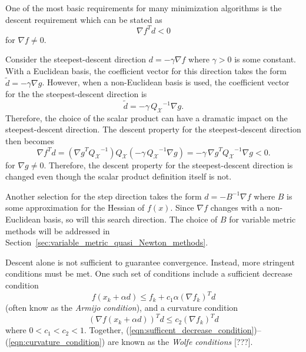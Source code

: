 One of the most basic requirements for many minimization algorithms is the
descent requirement which can be stated as
%
\begin{equation}
{\nabla f}^T d < 0
\label{eqn:descent_condition}
\end{equation}
%
for $\nabla f {}\ne 0$.

Consider the steepest-descent direction $d = -{}\gamma\nabla f$ where $\gamma
>0$ is some constant.  With a Euclidean basis, the coefficient vector for this
direction takes the form $\tilde{d} = -{}\gamma\nabla g$.  However, when a
non-Euclidean basis is used, the coefficient vector for the the
steepest-descent direction is
%
\[
\tilde{d} = - \gamma \, {Q_{\mathcal{X}}}^{-1} \nabla g. 
\]
%
Therefore, the choice of the scalar product can have a dramatic impact on the
steepest-descent direction.  The descent property for the steepest-descent direction then
becomes
%
\[
{\nabla f}^T d
= ( {\nabla g}^T {Q_{\mathcal{X}}}^{-1}) Q_{\mathcal{X}} (-\gamma\,{Q_{\mathcal{X}}}^{-1} \nabla g)
= -\gamma\,{\nabla g}^T {Q_{\mathcal{X}}}^{-1} \nabla g < 0.
\]
%
for $\nabla g {}\ne 0$.  Therefore, the descent property for the
steepest-descent direction is changed even though the scalar product
definition itself is not.

Another selection for the step direction takes the form $d = - B^{-1} {}\nabla
f$ where $B$ is some approximation for the Hessian of $f(x)$.  Since ${}\nabla
f$ changes with a non-Euclidean basis, so will this search direction.  The
choice of $B$ for variable metric methods will be addressed in
Section~\ref{sec:variable_metric_quasi_Newton_methods}.

Descent alone is not sufficient to guarantee convergence.  Instead, more
stringent conditions must be met.  One such set of conditions include a
sufficient decrease condition
%
\begin{equation}
f(x_k + \alpha d) \le f_k + c_1 \alpha (\nabla f_k)^T d
\label{eqn:sufficent_decrease_condition}
\end{equation}
%
(often know as the {}\textit{Armijo condition}), and a curvature condition
%
\begin{equation}
(\nabla f(x_k + \alpha d))^T d \le c_2 (\nabla f_k)^T d
\label{eqn:curvature_condition}
\end{equation}
%
where $0 < c_1 < c_2 < 1$.  Together,
(\ref{eqn:sufficent_decrease_condition})--(\ref{eqn:curvature_condition}) are
known as the {}\textit{Wolfe conditions} [???].

